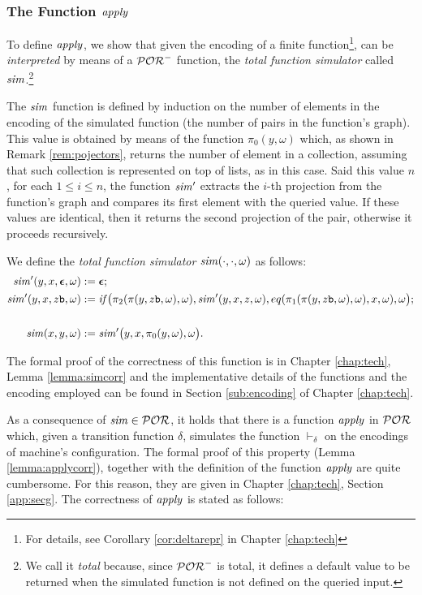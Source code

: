 \subsubsection{The Function $\mathit{apply}$}
\label{subsub:apply}

To define $\mathit{apply}$, we show that given the encoding of a finite function\footnote{For details, see Corollary \ref{cor:deltarepr} in Chapter \ref{chap:tech}}, can be
\emph{interpreted} by means of a $\mathcal{POR}^-$ function,
the \emph{total function simulator} called $\mathit{sim}$.\footnote{We call it \emph{total} because,
since $\mathcal{POR}^-$ is total, it defines a default value to be returned when the
simulated function is not defined on the queried input.}

The $\mathit{sim}$ function is defined by induction on the number of elements
in the encoding of the simulated function
(the number of pairs in the function's graph). This value is obtained by means
of the function
$\pi_0(y,\omega)$ which, as shown in Remark \ref{rem:pojectors},
returns the number of element in a collection, assuming that such collection
is represented on top of lists, as in this case.
Said this value $n$, for each $1 \le i \le n$,
the function  $\mathit{sim}'$ extracts the
$i$-th projection from the function's graph and compares its first element with
the queried value. If these values are identical,
then it returns the second projection of
the pair, otherwise it proceeds recursively.

\begin{defn}
We define the \emph{total function simulator}
$\mathit{sim}(\cdot, \cdot, \omega)$ as follows:
\begin{align*}
\simulate'(y,x,\eepsilon,\omega) &:= \eepsilon; \\
%
\simulate'(y,x,z\bool, \omega) &:= \mathit{if}\big(\pi_2(\pi(y,z\bool,\omega),
\omega), \simulate'(y,x,z,\omega), eq(\pi_1(\pi(y,z\bool,\omega),
\omega), x,\omega), \omega\big); \\
\\
\simulate(x,y,\omega) &:= \simulate'\big(y,x,\pi_0(y,\omega),\omega\big).
\end{align*}
\end{defn}

%
The formal proof of the correctness of this function is in Chapter \ref{chap:tech},
Lemma \ref{lemma:simcorr} and the implementative details of the functions and
the encoding employed can be found in Section \ref{sub:encoding} of Chapter \ref{chap:tech}.

As a consequence of $\mathit{sim} \in \mathcal{POR}$,
it holds that there is a function $\mathit{apply}$ in $\mathcal{POR}$ which,
given a transition function $\delta$, simulates the function $\vdash_\delta$
on the encodings of machine's configuration.
The formal proof of this property (Lemma \ref{lemma:applycorr}), together
with the definition of the function $\mathit{apply}$ are quite cumbersome. For this
reason, they are given in Chapter \ref{chap:tech}, Section \ref{app:secg}.
The correctness of $\mathit{apply}$ is stated as follows:

